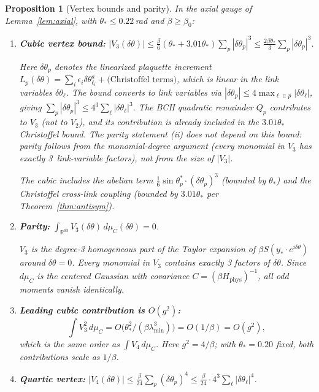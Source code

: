 \documentclass[11pt]{article}
\newtheorem{proposition}[theorem]{Proposition}
\theoremstyle{definition}
\newcommand{\R}{\mathbb{R}}
\begin{document}
\begin{proposition}[Vertex bounds and parity]\label{prop:vertex}
In the axial gauge of Lemma~\ref{lem:axial}, with $\theta_*\le 0.22$\,rad
and $\beta\ge\beta_0$:
\begin{enumerate}[nosep,label=(\roman*)]
\item \textbf{Cubic vertex bound:}
$|V_3(\delta\theta)|
\le\frac{\beta}{6}(\theta_*+3.01\theta_*)\sum_p|\delta\theta_p|^3
\le\frac{2\beta\theta_*}{3}\sum_p|\delta\theta_p|^3$.

Here $\delta\theta_p$ denotes the \emph{linearized plaquette
increment} $L_p(\delta\theta)=\sum_i\epsilon_i\delta\theta_{\ell_i}^a
+\text{(Christoffel terms)}$, which is linear in the
link variables $\delta\theta_\ell$.  The bound converts to link
variables via $|\delta\theta_p|\le 4\max_{\ell\in p}
|\delta\theta_\ell|$, giving
$\sum_p|\delta\theta_p|^3\le 4^3\sum_\ell|\delta\theta_\ell|^3$.
The BCH quadratic remainder $Q_p$ contributes to $V_3$ (not to
$V_2$), and its contribution is already included in the
$3.01\theta_*$ Christoffel bound.
\emph{The parity statement (ii) does not depend on this bound}:
parity follows from the monomial-degree argument (every monomial
in $V_3$ has exactly 3~link-variable factors), not from the
size of $|V_3|$.

The cubic includes the abelian term
$\frac{1}{6}\sin\theta_p^*\cdot(\delta\theta_p)^3$ (bounded by
$\theta_*$) and the Christoffel cross-link coupling
(bounded by $3.01\theta_*$ per Theorem~\ref{thm:antisym}).

\item \textbf{Parity:}
$\int_{\R^{93}} V_3(\delta\theta)\,d\mu_C(\delta\theta) = 0$.

$V_3$ is the degree-3 homogeneous part of the Taylor expansion
of $\beta S(y_*\cdot e^{i\delta\theta})$ around $\delta\theta=0$.
Every monomial in $V_3$ contains \emph{exactly 3} factors of
$\delta\theta$.  Since $d\mu_C$ is the centered Gaussian with
covariance $C=(\beta H_{\mathrm{phys}})^{-1}$, all odd moments
vanish identically.

\item \textbf{Leading cubic contribution is $O(g^2)$:}
\begin{equation}\label{eq:V3sq-scale}
\int V_3^2\,d\mu_C=O\bigl(\theta_*^2/(\beta\lambda_{\min}^3)\bigr)
=O(1/\beta)=O(g^2),
\end{equation}
which is the same order as $\int V_4\,d\mu_C$.  Here $g^2=4/\beta$;
with $\theta_*=0.20$ fixed, both contributions scale as $1/\beta$.

\item \textbf{Quartic vertex:}
$|V_4(\delta\theta)|
\le\frac{\beta}{24}\sum_p(\delta\theta_p)^4
\le\frac{\beta}{24}\cdot 4^3\sum_\ell|\delta\theta_\ell|^4$.
\end{enumerate}
\end{proposition}
\end{document}
